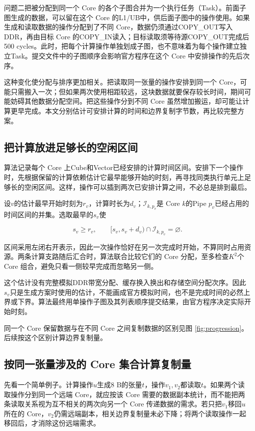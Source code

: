 \documentclass[anonymous,notoc]{gmcm2026}
\begin{document}
问题二把被分配到同一个 Core 的各个子图合并为一个执行任务（Task）。前面子图生成的数据，可以留在这个 Core 的L1/UB中，供后面子图中的操作使用。如果生成和读取数据的操作分配到了不同 Core，数据仍须通过COPY\_OUT写入DDR，再由目标 Core 的COPY\_IN读入；目标读取须等待源COPY\_OUT完成后500 cycles。此时，把每个计算操作单独划成子图，也不意味着为每个操作建立独立Task。提交文件中的子图顺序会影响官方程序在这个 Core 中安排操作的先后次序。

这种变化使分配与排序更加相关。把读取同一张量的操作安排到同一个 Core，可能只需搬入一次；但如果两次使用相距较远，这块数据就要保存较长时间，期间可能妨碍其他数据分配空间。把这些操作分到不同 Core 虽然增加搬运，却可能让计算更早完成。本文分别估计可安排计算的时间和边界复制字节数，再比较完整方案。

\subsection{把计算放进足够长的空闲区间}

算法记录每个 Core 上Cube和Vector已经安排的计算时间区间。安排下一个操作时，先根据保留的计算依赖估计它最早能够开始的时刻，再寻找同类执行单元上足够长的空闲区间。这样，操作可以插到两次已安排计算之间，不必总是排到最后。

设\(v\)的估计最早开始时刻为\(r_v\)，计算时长为\(d_v\)；\(\mathcal I_{k,p_v}\)是 Core \(k\)的Pipe \(p_v\)已经占用的时间区间的并集。选取最早的\(s_v\)使

\[s_v\ge r_v,\qquad [s_v,s_v+d_v)\cap\mathcal I_{k,p_v}=\varnothing.\]

区间采用左闭右开表示，因此一次操作恰好在另一次完成时开始，不算同时占用资源。两条计算支路随后汇合时，算法联合比较它们的 Core 分配，至多检查\(K^2\)个 Core 组合，避免只看一侧较早完成而忽略另一侧。

这个估计没有完整模拟DDR带宽分配、缓存换入换出和存储空间分配次序。因此\(s_v\)只是生成方案时使用的估计，不能画成官方模拟时间，也不是完成时间的必然上界或下界。算法最终用单操作子图及其列表顺序提交结果，由官方程序决定实际开始时刻。

同一个 Core 保留数据与在不同 Core 之间复制数据的区别见图 \ref{fig:progression}。后续按这个区别计算边界复制量。

\subsection{按同一张量涉及的 Core 集合计算复制量}

先看一个简单例子。计算操作\(u\)生成8 B的张量\(t\)，操作\(v_1,v_2\)都读取\(t\)。如果两个读取操作分到同一个远端 Core，就应按该 Core 需要的数据副本统计，而不能把两条读取关系视为互不相关的两次向另一个 Core 传递数据的需求。若只把\(v_1\)移回\(u\)所在的 Core，\(v_2\)仍需远端副本，相关边界复制量未必下降；将两个读取操作一起移回后，才消除这份远端需求。
\end{document}
